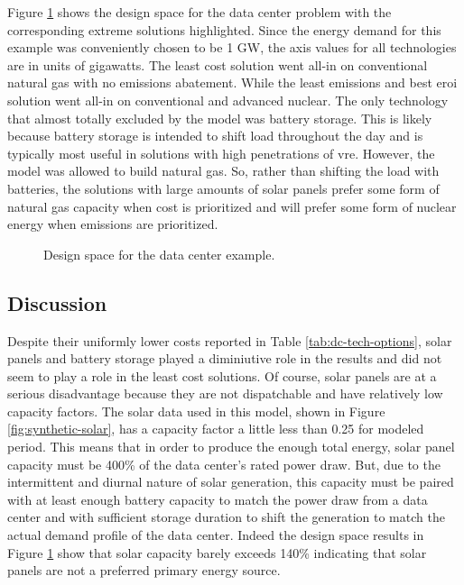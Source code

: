 Figure \ref{fig:dc_design_space} shows the design space for the data center
problem with the corresponding extreme solutions highlighted. Since the energy
demand for this example was conveniently chosen to be 1 GW, the axis values for
all technologies are in units of gigawatts. The least cost solution went all-in
on conventional natural gas with no emissions abatement. While the least
emissions and best \ac{eroi} solution went all-in on conventional and advanced
nuclear. The only technology that almost totally excluded by the model was
battery storage. This is likely because battery storage is intended to shift
load throughout the day and is typically most useful in solutions with high
penetrations of \ac{vre}. However, the model was allowed to build natural gas.
So, rather than shifting the load with batteries, the solutions with large
amounts of solar panels prefer some form of natural gas capacity when cost is
prioritized and will prefer some form of nuclear energy when emissions are
prioritized.

\begin{figure}[htbp!]
    \centering
    \resizebox{\columnwidth}{!}{}
    \caption{Design space for the data center example.}
    \label{fig:dc_design_space}
\end{figure}




\FloatBarrier
\subsection{Discussion}

Despite their uniformly lower costs reported in Table \ref{tab:dc-tech-options},
solar panels and battery storage played a diminiutive role in the results and
did not seem to play a role in the least cost solutions. Of course, solar panels
are at a serious disadvantage because they are not dispatchable and have
relatively low capacity factors. The solar data used in this model, shown in
Figure \ref{fig:synthetic-solar}, has a capacity factor a little less than 0.25
for modeled period. This means that in order to produce the enough total energy,
solar panel capacity must be 400\% of the data center's rated power draw. 
But, due to the intermittent and diurnal nature of solar generation, this capacity
must be paired with at least enough battery capacity to match the power draw from a 
data center and with sufficient storage duration to shift the generation to match 
the actual demand profile of the data center. Indeed the
design space results in Figure \ref{fig:dc_design_space} show that solar
capacity barely exceeds 140\% indicating that solar panels are not a preferred
primary energy source.


